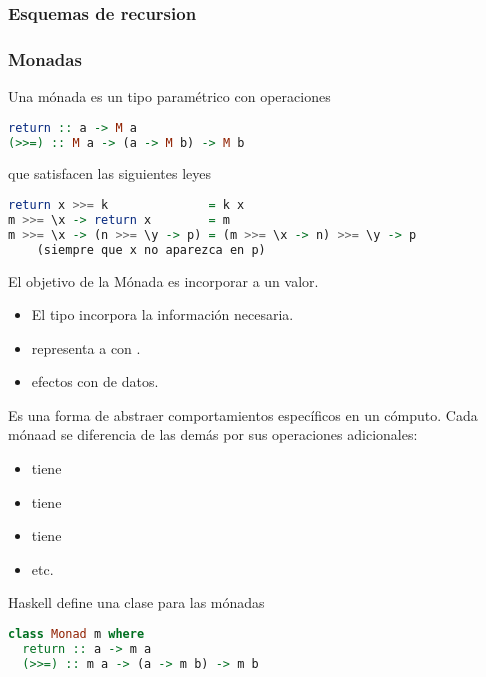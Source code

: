 \subsubsection{Esquemas de recursion}

\subsubsection{Monadas}

Una mónada es un tipo paramétrico  con operaciones

\begin{lstlisting}[language=Haskell]
return :: a -> M a
(>>=) :: M a -> (a -> M b) -> M b
\end{lstlisting}

que satisfacen las siguientes leyes

\begin{lstlisting}[language=Haskell]
return x >>= k              = k x
m >>= \x -> return x        = m
m >>= \x -> (n >>= \y -> p) = (m >>= \x -> n) >>= \y -> p
    (siempre que x no aparezca en p)
\end{lstlisting}

El objetivo de la Mónada es incorporar  a un valor.
\begin{itemize}
  \item El tipo  incorpora la información necesaria.
  \item {} representa a  con .
  \item \xtt{($>>=$)}  efectos con  de datos.
\end{itemize}

Es una forma de abstraer comportamientos específicos en un cómputo. Cada mónaad se diferencia de las demás por sus operaciones adicionales:
\begin{itemize}
  \item {} tiene 
  \item {} tiene 
  \item {} tiene 
  \item etc.
\end{itemize}

Haskell define una clase para las mónadas

\begin{lstlisting}[language=Haskell]
class Monad m where
  return :: a -> m a
  (>>=) :: m a -> (a -> m b) -> m b
\end{lstlisting}

